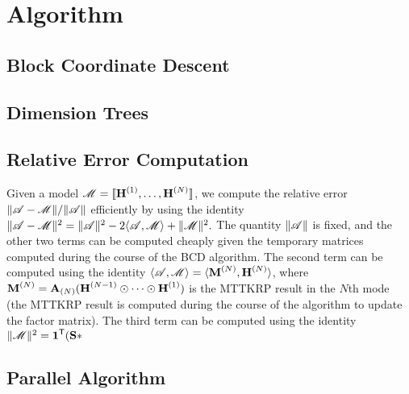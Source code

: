 \section{Algorithm} \label{sec:algorithm}

\subsection{Block Coordinate Descent}

\subsection{Dimension Trees}

\subsection{Relative Error Computation}

Given a model $\T{M}=\CP$, we compute the relative error $\|\TA - \T{M}\|/\|\TA\|$ efficiently by using the identity $\|\TA-\T{M}\|^2 = \|\TA\|^2 - 2\langle \TA, \T{M} \rangle + \|\T{M}\|^2.$
The quantity $\|\TA\|$ is fixed, and the other two terms can be computed cheaply given the temporary matrices computed during the course of the BCD algorithm.
The second term can be computed using the identity $\langle \TA, \T{M} \rangle = \langle \Mn{M}{N}, \Mn{H}{N} \rangle$, where $\Mn{M}{N} = \Mz{A}{N} (\Mn{H}{N-1} \Khat \cdots \Khat \Mn{H}{1})$ is the MTTKRP result in the $N$th mode (the MTTKRP result is computed during the course of the algorithm to update the factor matrix).
The third term can be computed using the identity $\|\T{M}\|^2 = \V{1}^\Tra(\M{S} \Hada $

\subsection{Parallel Algorithm}

